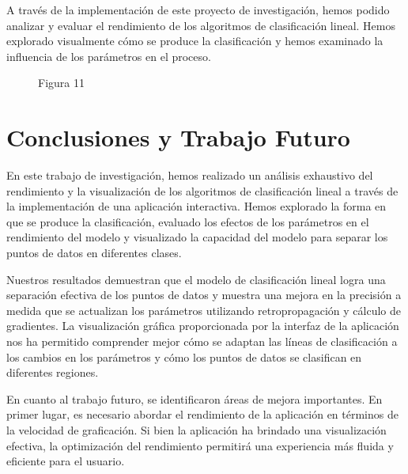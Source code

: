 \documentclass[twoside,10pt]{article}
\numberwithin{equation}{section}
\begin{document}
A través de la implementación de este proyecto de investigación, hemos podido analizar y evaluar el rendimiento de los algoritmos de clasificación lineal. Hemos explorado visualmente cómo se produce la clasificación y hemos examinado la influencia de los parámetros en el proceso.
\begin{figure}[ht]
    \centering
    \caption{Figura 11}
\end{figure}






\section{Conclusiones y Trabajo Futuro}

En este trabajo de investigación, hemos realizado un análisis exhaustivo del rendimiento y la visualización de los algoritmos de clasificación lineal a través de la implementación de una aplicación interactiva. Hemos explorado la forma en que se produce la clasificación, evaluado los efectos de los parámetros en el rendimiento del modelo y visualizado la capacidad del modelo para separar los puntos de datos en diferentes clases.

Nuestros resultados demuestran que el modelo de clasificación lineal logra una separación efectiva de los puntos de datos y muestra una mejora en la precisión a medida que se actualizan los parámetros utilizando retropropagación y cálculo de gradientes. La visualización gráfica proporcionada por la interfaz de la aplicación nos ha permitido comprender mejor cómo se adaptan las líneas de clasificación a los cambios en los parámetros y cómo los puntos de datos se clasifican en diferentes regiones.

En cuanto al trabajo futuro, se identificaron áreas de mejora importantes. En primer lugar, es necesario abordar el rendimiento de la aplicación en términos de la velocidad de graficación. Si bien la aplicación ha brindado una visualización efectiva, la optimización del rendimiento permitirá una experiencia más fluida y eficiente para el usuario.
\end{document}
